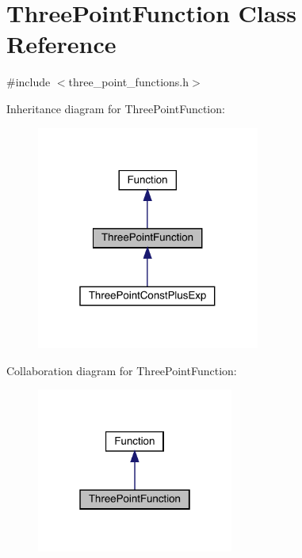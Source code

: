 \hypertarget{classThreePointFunction}{}\section{Three\+Point\+Function Class Reference}
\label{classThreePointFunction}


{\ttfamily \#include $<$three\+\_\+point\+\_\+functions.\+h$>$}



Inheritance diagram for Three\+Point\+Function\+:
\nopagebreak
\begin{figure}[H]
\begin{center}
\leavevmode
\includegraphics[width=208pt]{d6/d8b/classThreePointFunction__inherit__graph}
\end{center}
\end{figure}


Collaboration diagram for Three\+Point\+Function\+:
\nopagebreak
\begin{figure}[H]
\begin{center}
\leavevmode
\includegraphics[width=183pt]{d5/d18/classThreePointFunction__coll__graph}
\end{center}
\end{figure}

